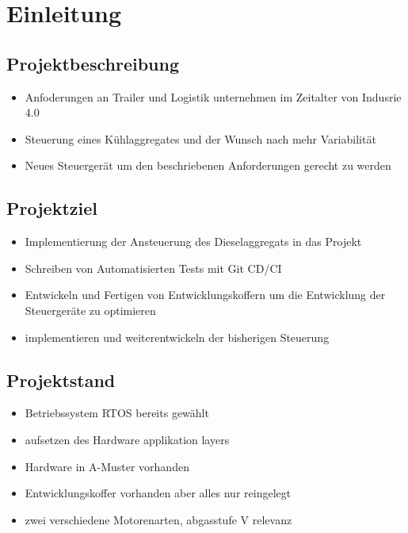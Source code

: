 \clearpage
\chapter{\textbf{Einleitung}}\label{Einleitung}

\section {Projektbeschreibung}
	
	\begin{itemize}
		\item Anfoderungen an Trailer und Logistik unternehmen im Zeitalter von Indusrie 4.0
		\item Steuerung eines Kühlaggregates und der Wunsch nach mehr Variabilität
		\item Neues Steuergerät um den beschriebenen Anforderungen gerecht zu werden 
	\end{itemize}
	

\section {Projektziel}
	\begin{itemize}
		\item Implementierung der Ansteuerung des Dieselaggregats in das Projekt
		\item Schreiben von Automatisierten Tests mit Git CD/CI 
		\item Entwickeln und Fertigen von Entwicklungskoffern um die Entwicklung der Steuergeräte zu optimieren 
		\item implementieren und weiterentwickeln der bisherigen Steuerung 
	\end{itemize}


\section {Projektstand}
	\begin{itemize}
		\item Betriebssystem RTOS bereits gewählt 
		\item aufsetzen des Hardware applikation layers 
		\item Hardware in A-Muster vorhanden
		\item Entwicklungskoffer vorhanden aber alles nur reingelegt 
		\item zwei verschiedene Motorenarten, abgasstufe V relevanz  
	\end{itemize}